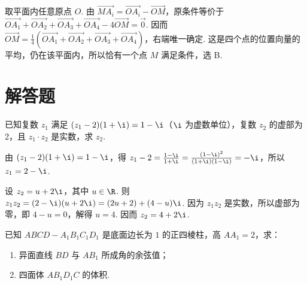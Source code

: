 \begin{solution}
取平面内任意原点 \(O\). 由 \(\overrightarrow{MA_i}=\overrightarrow{OA_i}-\overrightarrow{OM}\)，原条件等价于
\(\overrightarrow{OA_1}+\overrightarrow{OA_2}+\overrightarrow{OA_3}+\overrightarrow{OA_4}-4\overrightarrow{OM}=\overrightarrow0\). 因而
\(\overrightarrow{OM}=\frac14\left(\overrightarrow{OA_1}+\overrightarrow{OA_2}+\overrightarrow{OA_3}+\overrightarrow{OA_4}\right)\)，右端唯一确定. 这是四个点的位置向量的平均，仍在该平面内，所以恰有一个点 \(M\) 满足条件，选 B.
\end{solution}

\section{解答题}

\begin{problem}
已知复数 \(z_{1}\) 满足 \((z_{1} - 2)(1 + \i) = 1 - \i\)（\(\i\) 为虚数单位），复数 \(z_{2}\) 的虚部为 2，且 \(z_{1} \cdot z_{2}\) 是实数，求 \(z_{2}\).
\end{problem}

\begin{solution}
由 \((z_1-2)(1+\i)=1-\i\)，得
\(z_1-2=\frac{1-\i}{1+\i}=\frac{(1-\i)^2}{(1+\i)(1-\i)}=-\i\)，所以 \(z_1=2-\i\).

设 \(z_2=u+2\i\)，其中 \(u\in\R\). 则
\(z_1z_2=(2-\i)(u+2\i)=(2u+2)+(4-u)\i\). 因为 \(z_1z_2\) 是实数，所以虚部为零，即 \(4-u=0\)，解得 \(u=4\). 因而 \(z_2=4+2\i\).
\end{solution}

\begin{problem}
已知 \(ABCD - A_{1}B_{1}C_{1}D_{1}\) 是底面边长为 \(1\) 的正四棱柱，高 \(AA_{1} = 2\)，求：
\begin{enumerate}
\item 异面直线 \(BD\) 与 \(AB_{1}\) 所成角的余弦值；
\item 四面体 \(AB_{1}D_{1}C\) 的体积.
\end{enumerate}
\end{problem}

